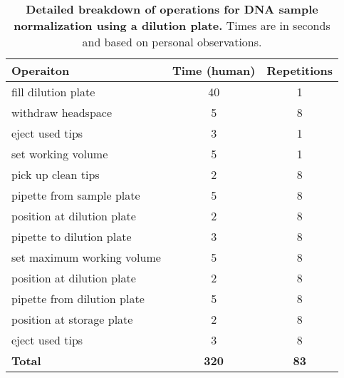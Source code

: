 \begin{table}[]
\centering
\begin{tabular}{lcc}
\toprule
\textbf{Operaiton} & \textbf{Time (human)} & Repetitions \\ \midrule
fill dilution plate & 40 & 1 \\
withdraw headspace & 5 & 8 \\
eject used tips & 3 & 1 \\
set working volume & 5 & 1 \\
\midrule
pick up clean tips & 2 & 8 \\
pipette from sample plate & 5 & 8 \\
position at dilution plate & 2 & 8 \\
pipette to dilution plate & 3 & 8 \\
set maximum working volume & 5 & 8 \\
position at dilution plate & 2 & 8 \\
pipette from dilution plate & 5 & 8 \\
position at storage plate & 2 & 8 \\
eject used tips & 3 & 8 \\
\textbf{Total} & \textbf{320} & \textbf{83} \\ \bottomrule
\end{tabular}
\caption{\textbf{Detailed breakdown of operations for DNA sample normalization using a dilution plate.} Times are in seconds and based on personal observations.}
\label{DP_table2}
\end{table}